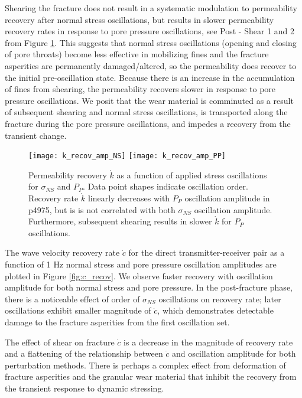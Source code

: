 \documentclass[draft]{agujournal2019}
\begin{document}
Shearing the fracture does not result in a systematic modulation to permeability recovery after normal stress oscillations, but results in slower permeability recovery rates in response to pore pressure oscillations, see Post - Shear 1 and 2 from Figure \ref{fig:k_recov}. This suggests that normal stress oscillations (opening and closing of pore throats) become less effective in mobilizing fines and the fracture asperities are permanently damaged/altered, so the permeability does recover to the initial pre-oscillation state. Because there is an increase in the accumulation of fines from shearing, the permeability recovers slower in response to pore pressure oscillations. We posit that the wear material is comminuted as a result of subsequent shearing and normal stress oscillations, is transported along the fracture during the pore pressure oscillations, and impedes a recovery from the transient change.

\clearpage

\begin{figure}[ht]
	\centering
	\texttt{[image: k\_recov\_amp\_NS]}
	\texttt{[image: k\_recov\_amp\_PP]}
	\caption{Permeability recovery $ \dot k $ as a function of applied stress oscillations for $ \sigma_{NS} $ and $ P_P $. Data point shapes indicate oscillation order. Recovery rate $ \dot k $ linearly decreases with $ P_P $ oscillation amplitude in p4975, but is is not correlated with both $ \sigma_{NS} $ oscillation amplitude. Furthermore, subsequent shearing results in slower $ \dot k $ for $ P_P $ oscillations. }
	\label{fig:k_recov}
\end{figure}
\clearpage


The wave velocity recovery rate $ \dot c $ for the direct transmitter-receiver pair as a function of 1 Hz normal stress and pore pressure oscillation amplitudes are plotted in Figure \ref{fig:c_recov}. We observe faster recovery with oscillation amplitude for both normal stress and pore pressure. In the post-fracture phase, there is a noticeable effect of order of $ \sigma_{NS} $ oscillations on recovery rate; later oscillations exhibit smaller magnitude of $ \dot c$, which demonstrates detectable damage to the fracture asperities from the first oscillation set.  


The effect of shear on fracture $ \dot c $ is a decrease in the magnitude of recovery rate and a flattening of the relationship between $ \dot c $ and oscillation amplitude for both perturbation methods. There is perhaps a complex effect from deformation of fracture asperities and the granular wear material that inhibit the recovery from the transient response to dynamic stressing.  
\end{document}
